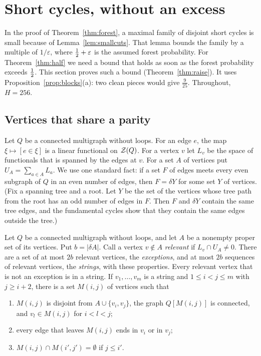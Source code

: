 \section{Short cycles, without an excess}\label{sec:packing}

In the proof of Theorem~\ref{thm:forest}, a maximal family of disjoint short cycles is small because
of Lemma~\ref{lem:smallcuts}. That lemma bounds the family by a multiple of $1/\varepsilon$, where
$\tfrac12+\varepsilon$ is the assumed forest probability. For Theorem~\ref{thm:half} we need a bound
that holds as soon as the forest probability exceeds $\tfrac12$. This section proves such a bound
(Theorem~\ref{thm:raise}). It uses Proposition~\ref{prop:blocks}(a): two clean pieces would give
$\frac9{25}$. Throughout, $H=256$.

\subsection{Vertices that share a parity}

Let $Q$ be a connected multigraph without loops. For an edge $e$, the map
$\xi\mapsto[e\in\xi]$ is a linear functional on $\mathcal{Z}(Q)$. For a vertex $v$ let $L_v$ be the space
of functionals that is spanned by the edges at $v$. For a set $A$ of vertices put
$U_A=\sum_{a\in A}L_a$. We use one standard fact: if a set $F$ of edges meets every even subgraph of
$Q$ in an even number of edges, then $F=\delta Y$ for some set $Y$ of vertices. (Fix a spanning
tree and a root. Let $Y$ be the set of the vertices whose tree path from the root has an odd number
of edges in $F$. Then $F$ and $\delta Y$ contain the same tree edges, and the fundamental cycles
show that they contain the same edges outside the tree.)

\begin{lemma}[Strings]\label{lem:strings}
Let $Q$ be a connected multigraph without loops, and let $A$ be a nonempty proper set of its
vertices. Put $b=|\delta A|$. Call a vertex $v\notin A$ \emph{relevant} if $L_v\cap U_A\ne0$. There
are a set of at most $2b$ relevant vertices, the \emph{exceptions}, and at most $2b$ sequences of
relevant vertices, the \emph{strings}, with these properties. Every relevant vertex that is not an
exception is in a string. If $v_1,\dots,v_m$ is a string and $1\le i<j\le m$ with $j\ge i+2$, there
is a set $M(i,j)$ of vertices such that
\begin{enumerate}
\item[\textup{(i)}] $M(i,j)$ is disjoint from $A\cup\{v_i,v_j\}$, the graph $Q[M(i,j)]$ is
connected, and $v_l\in M(i,j)$ for $i<l<j$;
\item[\textup{(ii)}] every edge that leaves $M(i,j)$ ends in $v_i$ or in $v_j$;
\item[\textup{(iii)}] $M(i,j)\cap M(i',j')=\emptyset$ if $j\le i'$.
\end{enumerate}
\end{lemma}

